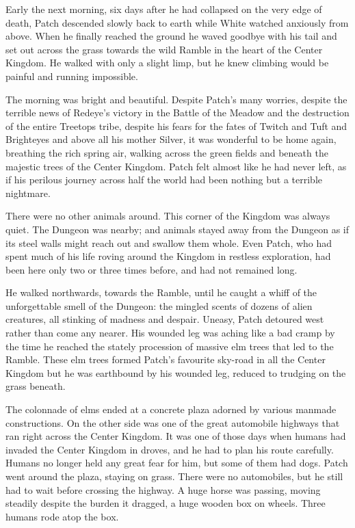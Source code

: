 \documentclass[12pt]{book}
\begin{document}
 Early the next morning, six days after he had collapsed on the very edge of death, Patch descended slowly back to earth while White watched anxiously from above. When he finally reached the ground he waved goodbye with his tail and set out across the grass towards the wild Ramble in the heart of the Center Kingdom. He walked with only a slight limp, but he knew climbing would be painful and running impossible.\par
 The morning was bright and beautiful. Despite Patch's many worries, despite the terrible news of Redeye's victory in the Battle of the Meadow and the destruction of the entire Treetops tribe, despite his fears for the fates of Twitch and Tuft and Brighteyes and above all his mother Silver, it was wonderful to be home again, breathing the rich spring air, walking across the green fields and beneath the majestic trees of the Center Kingdom. Patch felt almost like he had never left, as if his perilous journey across half the world had been nothing but a terrible nightmare.\par
 There were no other animals around. This corner of the Kingdom was always quiet. The Dungeon was nearby; and animals stayed away from the Dungeon as if its steel walls might reach out and swallow them whole. Even Patch, who had spent much of his life roving around the Kingdom in restless exploration, had been here only two or three times before, and had not remained long. \par
 He walked northwards, towards the Ramble, until he caught a whiff of the unforgettable smell of the Dungeon: the mingled scents of dozens of alien creatures, all stinking of madness and despair. Uneasy, Patch detoured west rather than come any nearer. His wounded leg was aching like a bad cramp by the time he reached the stately procession of massive elm trees that led to the Ramble. These elm trees formed Patch's favourite sky-road in all the Center Kingdom %
 but he was earthbound by his wounded leg, reduced to trudging on the grass beneath.\par
 The colonnade of elms ended at a concrete plaza adorned by various manmade constructions. On the other side was one of the great automobile highways that ran right across the Center Kingdom. It was one of those days when humans had invaded the Center Kingdom in droves, and he had to plan his route carefully. Humans no longer held any great fear for him, but some of them had dogs. Patch went around the plaza, staying on grass. There were no automobiles, but he still had to wait before crossing the highway. A huge horse was passing, moving steadily despite the burden it dragged, a huge wooden box on wheels. Three humans rode atop the box.\par
\end{document}
